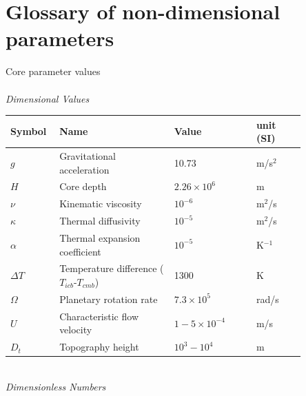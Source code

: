 \chapter{Glossary of non-dimensional parameters}
\label{a:gloss}
\begin{table}
\begin{center}
	Core parameter values\\
\hrulefill\\
\textit{Dimensional Values}\\
\vspace{1mm}
\begin{tabular}{|p{0.1\linewidth}p{0.35\linewidth}p{0.25\linewidth}p{0.15\linewidth}|}
\hline
Symbol & Name&Value & unit (SI)\\
\hline
$g$&Gravitational acceleration & {10.73}& m/s$^{2}$\\
$H$ & Core depth & $2.26\times 10^{6}$ & m \\
$\nu$ & Kinematic viscosity & $10^{-6}$ & m$^{2}$/s\\
$\kappa$ & Thermal diffusivity & $10^{-5}$ & m$^{2}$/s\\
$\alpha$ & Thermal expansion coefficient & $10^{-5}$ & K$^{-1}$\\
$\Delta T$ & Temperature difference ($T_{icb}$-$T_{cmb}$) & 1300 & K\\
$\Omega$ &  Planetary rotation rate & $7.3\times 10^{5}$ & rad/s\\
$U$ &  Characteristic flow velocity & $1-5\times 10^{-4}$ & m/s\\
$D_{t}$ &  Topography height & $10^{3}-10^{4}$ & m\\
\hline
\end{tabular}
\vspace{1mm}\\
\textit{Dimensionless Numbers}\\
\vspace{1mm}
\begin{tabular}{|p{0.1\linewidth} p{0.35\linewidth} p{0.25\linewidth} p{0.15\linewidth}|}
	

\end{tabular}
\end{center}
\end{table}
